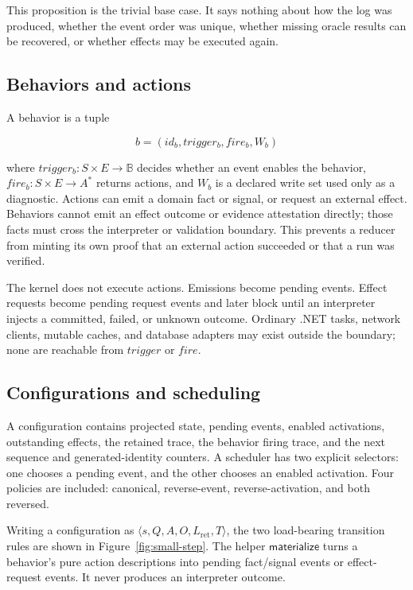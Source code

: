 This proposition is the trivial base case.  It says nothing about how the log
was produced, whether the event order was unique, whether missing oracle
results can be recovered, or whether effects may be executed again.

\subsection{Behaviors and actions}

A behavior is a tuple

\begin{equation}
 b=(id_b, trigger_b, fire_b, W_b)
\end{equation}

where $trigger_b:S\times E\rightarrow\mathbb{B}$ decides whether an event
enables the behavior, $fire_b:S\times E\rightarrow A^*$ returns actions, and
$W_b$ is a declared write set used only as a diagnostic.  Actions can emit a
domain fact or signal, or request an external effect.  Behaviors cannot emit an
effect outcome or evidence attestation directly; those facts must cross the
interpreter or validation boundary.  This prevents a reducer from minting its
own proof that an external action succeeded or that a run was verified.

The kernel does not execute actions.  Emissions become pending events.  Effect
requests become pending request events and later block until an interpreter
injects a committed, failed, or unknown outcome.  Ordinary .NET tasks, network
clients, mutable caches, and database adapters may exist outside the boundary;
none are reachable from $trigger$ or $fire$.

\subsection{Configurations and scheduling}

A configuration contains projected state, pending events, enabled activations,
outstanding effects, the retained trace, the behavior firing trace, and the next
sequence and generated-identity counters.  A scheduler has two explicit
selectors: one chooses a pending event, and the other chooses an enabled
activation.  Four policies are included: canonical, reverse-event,
reverse-activation, and both reversed.

Writing a configuration as $\langle s,Q,A,O,L_{\mathrm{ret}},T\rangle$, the two load-bearing
transition rules are shown in Figure~\ref{fig:small-step}.  The helper
$\mathsf{materialize}$ turns a behavior's pure action descriptions into pending
fact/signal events or effect-request events.  It never produces an interpreter
outcome.

